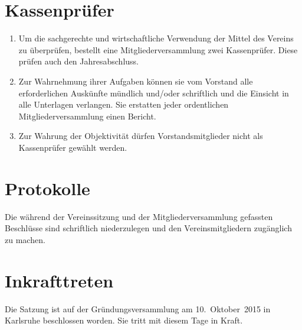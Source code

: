 \documentclass[a4paper]{scrartcl}
\newcommand\Gruendungsdatum{10.~Oktober~2015}
\begin{document}
\section{Kassenprüfer}
\begin{enumerate}
    \item Um die sachgerechte und wirtschaftliche Verwendung der Mittel des
          Vereins zu überprüfen, bestellt eine Mitgliederversammlung zwei
          Kassenprüfer. Diese prüfen auch den Jahresabschluss.
    \item Zur Wahrnehmung ihrer Aufgaben können sie vom Vorstand alle
          erforderlichen Auskünfte mündlich und/oder schriftlich und die
          Einsicht in alle Unterlagen verlangen. Sie erstatten jeder
          ordentlichen Mitgliederversammlung einen Bericht.
    \item Zur Wahrung der Objektivität dürfen Vorstandsmitglieder nicht als
          Kassenprüfer gewählt werden.
\end{enumerate}

\section{Protokolle}
Die während der Vereinssitzung und der Mitgliederversammlung gefassten
Beschlüsse sind schriftlich niederzulegen und den Vereinsmitgliedern
zugänglich zu machen.

\section{Inkrafttreten}
Die Satzung ist auf der Gründungsversammlung am \Gruendungsdatum{} in Karlsruhe
beschlossen worden. Sie tritt mit diesem Tage in Kraft.

\end{document}
